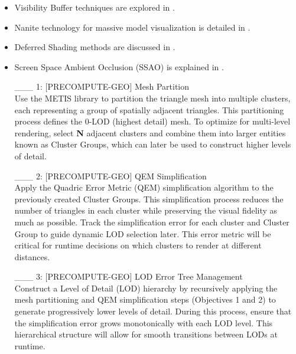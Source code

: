 \documentclass {article}
\begin{document}
\begin{itemize}
     \item Visibility Buffer techniques are explored in \cite{FilmicWorlds}.
     \item Nanite technology for massive model visualization is detailed in \cite{Karis2021Nanite}.
     \item Deferred Shading methods are discussed in \cite{LearnOpenGLDeferred}.
     \item Screen Space Ambient Occlusion (SSAO) is explained in \cite{LearnOpenGLSSAO}.
\end{itemize}

\newpage


\begin{enumerate}
     \item[\_\_\_ 1:]  [PRECOMPUTE-GEO] Mesh Partition
     \\ Use the METIS library to partition the triangle mesh into multiple clusters, each representing a group of spatially 
     adjacent triangles. This partitioning process defines the 0-LOD (highest detail) mesh. To optimize for multi-level 
     rendering, select {\bf N} adjacent clusters and combine them into larger entities known as Cluster Groups, which can 
     later be used to construct higher levels of detail.
 
     \item[\_\_\_ 2:]  [PRECOMPUTE-GEO] QEM Simplification
     \\ Apply the Quadric Error Metric (QEM) simplification algorithm to the previously created Cluster Groups. This 
     simplification process reduces the number of triangles in each cluster while preserving the visual fidelity as much as 
     possible. Track the simplification error for each cluster and Cluster Group to guide dynamic LOD selection later. This 
     error metric will be critical for runtime decisions on which clusters to render at different distances.
 
     \item[\_\_\_ 3:]  [PRECOMPUTE-GEO] LOD Error Tree Management
     \\ Construct a Level of Detail (LOD) hierarchy by recursively applying the mesh partitioning and QEM simplification 
     steps (Objectives 1 and 2) to generate progressively lower levels of detail. During this process, ensure that the 
     simplification error grows monotonically with each LOD level. This hierarchical structure will allow for smooth 
     transitions between LODs at runtime.
 

\end{enumerate}
\end{document}
